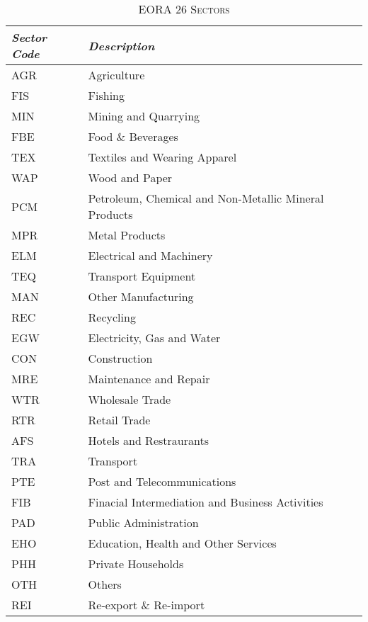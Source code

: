 \documentclass[a4paper]{article}
\begin{document}
\begin{table}[h!]
\centering
\caption{\textsc{EORA 26 Sectors}}

\label{tab:sec}
\vspace{2mm}
\begin{tabular}{ll} \toprule
\textit{Sector Code} & \textit{Description} \\ \midrule
AGR & Agriculture \\
 FIS & Fishing \\
 MIN & Mining and Quarrying \\
 FBE & Food \& Beverages \\
 TEX & Textiles and Wearing Apparel \\
 WAP & Wood and Paper \\
 PCM & Petroleum, Chemical and Non-Metallic Mineral Products \\
 MPR & Metal Products \\
 ELM & Electrical and Machinery \\
 TEQ & Transport Equipment \\
 MAN & Other Manufacturing \\
 REC & Recycling \\
 EGW & Electricity, Gas and Water \\
 CON & Construction \\
 MRE & Maintenance and Repair \\
 WTR & Wholesale Trade \\
 RTR & Retail Trade \\
 AFS & Hotels and Restraurants \\
 TRA & Transport \\
 PTE & Post and Telecommunications \\
 FIB & Finacial Intermediation and Business Activities \\
 PAD & Public Administration \\
 EHO & Education, Health and Other Services \\
 PHH & Private Households \\
 OTH & Others \\
 REI & Re-export \& Re-import \\ \bottomrule
\end{tabular}
\end{table}
\FloatBarrier
\end{document}
